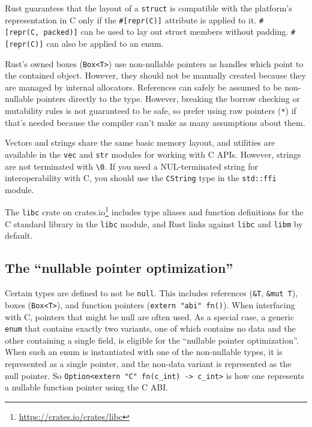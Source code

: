 \documentclass[a4paper,]{book}
\renewcommand{\href}[2]{#2\footnote{\url{#1}}}
\begin{document}
Rust guarantees that the layout of a \texttt{struct} is compatible with
the platform's representation in C only if the \texttt{\#{[}repr(C){]}}
attribute is applied to it. \texttt{\#{[}repr(C,\ packed){]}} can be
used to lay out struct members without padding. \texttt{\#{[}repr(C){]}}
can also be applied to an enum.

Rust's owned boxes (\texttt{Box\textless{}T\textgreater{}}) use
non-nullable pointers as handles which point to the contained object.
However, they should not be manually created because they are managed by
internal allocators. References can safely be assumed to be non-nullable
pointers directly to the type. However, breaking the borrow checking or
mutability rules is not guaranteed to be safe, so prefer using raw
pointers (\texttt{*}) if that's needed because the compiler can't make
as many assumptions about them.

Vectors and strings share the same basic memory layout, and utilities
are available in the \texttt{vec} and \texttt{str} modules for working
with C APIs. However, strings are not terminated with
\texttt{\textbackslash{}0}. If you need a NUL-terminated string for
interoperability with C, you should use the \texttt{CString} type in the
\texttt{std::ffi} module.

The \href{https://crates.io/crates/libc}{\texttt{libc} crate on
crates.io} includes type aliases and function definitions for the C
standard library in the \texttt{libc} module, and Rust links against
\texttt{libc} and \texttt{libm} by default.

\subsection{\texorpdfstring{The ``nullable pointer
optimization''}{The nullable pointer optimization}}\label{the-nullable-pointer-optimization}

Certain types are defined to not be \texttt{null}. This includes
references (\texttt{\&T}, \texttt{\&mut\ T}), boxes
(\texttt{Box\textless{}T\textgreater{}}), and function pointers
(\texttt{extern\ "abi"\ fn()}). When interfacing with C, pointers that
might be null are often used. As a special case, a generic \texttt{enum}
that contains exactly two variants, one of which contains no data and
the other containing a single field, is eligible for the ``nullable
pointer optimization''. When such an enum is instantiated with one of
the non-nullable types, it is represented as a single pointer, and the
non-data variant is represented as the null pointer. So
\texttt{Option\textless{}extern\ "C"\ fn(c\_int)\ -\textgreater{}\ c\_int\textgreater{}}
is how one represents a nullable function pointer using the C ABI.
\end{document}
